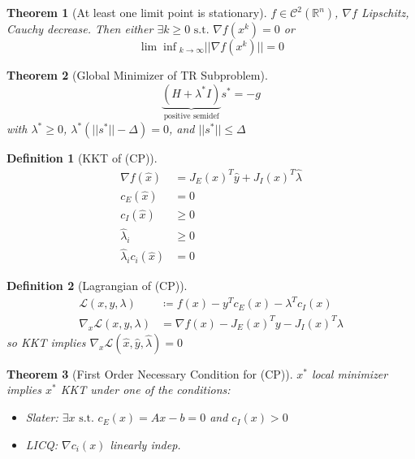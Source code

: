 \documentclass[a4paper]{article}
\newcommand{\R}{\mathbb{R}}
\newcommand{\C}{\mathcal{C}}
\newcommand{\Lagrangian}{\mathcal{L}}
\newcommand{\st}{\text{ s.t. }}
\newcommand{\norm}[1]{\lvert \lvert #1 \rvert \rvert}
\newtheorem{theorem}{Theorem}
\newtheorem*{definition*}{Definition}
\begin{document}
\begin{theorem}[At least one limit point is stationary]
    $f \in \C^2 \left( \R^n \right)$, $\nabla f$ Lipschitz, Cauchy decrease.
    Then either $\exists k \geq 0 \st \nabla f \left( x^k \right) = 0$ or
    \begin{equation*}
        {\lim \inf}_{k \rightarrow \infty} \norm{\nabla f \left( x^k \right)} = 0
    \end{equation*}
\end{theorem}

\begin{theorem}[Global Minimizer of TR Subproblem]
    \begin{equation*}
        \underbrace{\left( H + \lambda^* I \right)}_{\text{positive semidef}} s^{*} = -g
    \end{equation*}
    with $\lambda^* \geq 0$, $\lambda^* \left( \norm{s^*} - \Delta \right) = 0$, and $\norm{s^*} \leq \Delta$
\end{theorem}

\begin{definition*}[KKT of (CP)]
    \begin{align*}
        \nabla f \left( \hat x \right) &= J_E (x)^T \hat y + J_{I}(x)^T \hat \lambda \\
        c_E \left( \hat x \right) &= 0 \\
        c_I \left( \hat x \right) &\geq 0 \\
        \hat \lambda_i &\geq 0 \\
        \hat \lambda_i c_i \left( \hat x \right) &= 0
    \end{align*}
\end{definition*}

\begin{definition*}[Lagrangian of (CP)]
    \begin{align*}
        \Lagrangian \left( x, y, \lambda \right) &\coloneqq f(x) - y^T c_E (x) - \lambda^T c_I (x) \\
        \nabla_x \Lagrangian \left( x,y, \lambda \right) &= \nabla f(x) - J_E (x)^T y - J_I(x)^T \lambda
    \end{align*}
    so KKT implies $\nabla_{x} \Lagrangian \left( \hat x, \hat y, \hat \lambda \right) = 0$
\end{definition*}

\begin{theorem}[First Order Necessary Condition for (CP)]
    $x^*$ local minimizer implies $x^*$ KKT under one of the conditions:
    \begin{itemize}
        \item Slater: $\exists x \st c_E(x) = Ax - b = 0$ and $c_I(x) > 0$
        \item LICQ: $\nabla c_i (x)$ linearly indep.
    \end{itemize}
\end{theorem}
\end{document}
